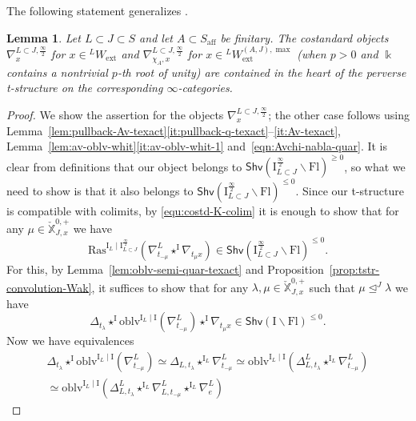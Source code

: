 \documentclass[11pt]{amsart}
\numberwithin{equation}{section}
\theoremstyle{plain}
\newtheorem{lem}[thm]{Lemma}
\theoremstyle{definition}
\newcommand{\I}{{\mathrm I}}
\renewcommand{\k}{\Bbbk}
\newcommand{\X}{{\mathbb X}}
\newcommand{\Xd}{\check{\X}}
\newcommand{\semi}{{{\frac{\infty}{2}}}}
\newcommand{\oblv}{\mathrm{oblv}}
\newcommand{\ex}{\mathrm{ext}}
\newcommand{\af}{\mathrm{aff}}
\newcommand{\Shv}{\mathsf{Shv}}
\newcommand{\Ras}{\mathrm{Ras}}
\newcommand{\Fl}{\mathrm{Fl}}
\begin{document}
The following statement generalizes \cite[Proposition~6.12]{adr}. 

\begin{lem}
\label{lem:costandard-perverse}
Let $L\subset J\subset S$ and let $A\subset S_\af$ be finitary. 
The costandard objects $\nabla_x^{L\subset J,\semi}$ for $x \in {}^L W_\ex$ and $\nabla_{\chi_A,x}^{L\subset J,\semi}$ for $x \in {}^L W_\ex^{(A,J),\max}$ (when $p>0$ and $\k$ contains a nontrivial $p$-th root of unity) are contained in the heart of the perverse t-structure on the corresponding $\infty$-categories. 
\end{lem}

\begin{proof}
We show the assertion for the objects $\nabla_x^{L\subset J,\semi}$; the other case follows using Lemma~\ref{lem:pullback-Av-texact}\eqref{it:pullback-q-texact}--\eqref{it:Av-texact}, Lemma~\ref{lem:av-oblv-whit}\eqref{it:av-oblv-whit-1} and~\eqref{eqn:Avchi-nabla-quar}.
It is clear from definitions that our object belongs to $\Shv\left(\I_{L\subset J}^\semi \backslash \Fl \right)^{\geq 0}$, so what we need to show is that it also belongs to $\Shv\left(\I_{L\subset J}^\semi \backslash \Fl \right)^{\leq 0}$. 
Since our t-structure is compatible with colimits, by \eqref{equ:costd-K-colim} it is enough to show that for any $\mu\in \Xd_{J,x}^{0,+}$ we have
\[
\Ras^{\I_L\mid \I^\semi_{L\subset J}}(\nabla^L_{t_{-\mu}} \star^{\I} \nabla_{t_\mu x}) 
 \in
\Shv\left(\I_{L\subset J}^\semi \backslash \Fl \right)^{\leq 0}. 
\]
For this, by Lemma~\ref{lem:oblv-semi-quar-texact} and Proposition~\ref{prop:tstr-convolution-Wak}, it suffices to show that for any $\lambda, \mu \in \Xd_{J,x}^{0,+}$ such that $\mu \unlhd^J \lambda$ we have
\begin{equation}
\label{equ:costd-perv}
\Delta_{t_\lambda} \star^\I \oblv^{\I_L\mid \I}(\nabla^L_{t_{-\mu}}) \star^{\I} \nabla_{t_\mu x}
 \in
\Shv(\I\backslash \Fl)^{\leq 0}. 
\end{equation}
Now we have equivalences 
\begin{multline*}
\Delta_{t_\lambda} \star^\I \oblv^{\I_L\mid \I}(\nabla^L_{t_{-\mu}})
\simeq \Delta_{L,t_\lambda} \star^{\I_L} \nabla^L_{t_{-\mu}} 
\simeq \oblv^{\I_L\mid \I}(\Delta^L_{L,t_\lambda} \star^{\I_L} \nabla^L_{t_{-\mu}}) \\ 
\simeq \oblv^{\I_L\mid \I}(\Delta^L_{L,t_\lambda} \star^{\I_L} \nabla^L_{L,t_{-\mu}} \star^{\I_L} \nabla^L_e) 

\end{multline*}
\end{proof}
\end{document}
